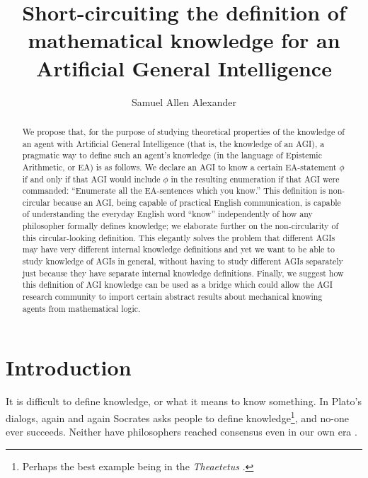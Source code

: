 \documentclass[runningheads]{llncs}
\begin{document}
\title{Short-circuiting the definition of mathematical knowledge for an
Artificial General Intelligence
}


\author{Samuel Allen
Alexander}



\maketitle

\begin{abstract}
We propose that, for the purpose of studying theoretical properties of
the knowledge of an agent with Artificial General Intelligence (that is, 
the knowledge of an AGI),
a pragmatic way to define such an agent's knowledge (in the language
of Epistemic Arithmetic, or EA) is as follows.
We declare an AGI to know a certain EA-statement $\phi$
if and only if that AGI would include $\phi$ in the resulting
enumeration if that AGI were commanded:
``Enumerate all the EA-sentences which you know.''
This definition is non-circular because an AGI, being capable of
practical English communication, is capable of understanding the everyday
English word ``know'' independently of how any philosopher formally
defines knowledge; we elaborate further on the non-circularity of this
circular-looking definition.
This elegantly solves the problem that different AGIs may have
very different internal knowledge definitions and yet we want
to be able to study knowledge of AGIs in general, without having
to study different AGIs separately just because they have separate
internal knowledge definitions. Finally, we suggest how this
definition of AGI knowledge can be used as a bridge which could
allow the AGI research community to import certain abstract results
about mechanical knowing agents from mathematical logic.
\end{abstract}

\section{Introduction}

It is difficult to define knowledge, or what it means to know something.
In Plato's dialogs, again and again Socrates asks people to define
knowledge\footnote{Perhaps the best example being in the \emph{Theaetetus}
\cite{theaetetus}.}, and no-one ever succeeds. Neither have philosophers
reached consensus even in our own era \cite{sep-knowledge-analysis}.
\end{document}
